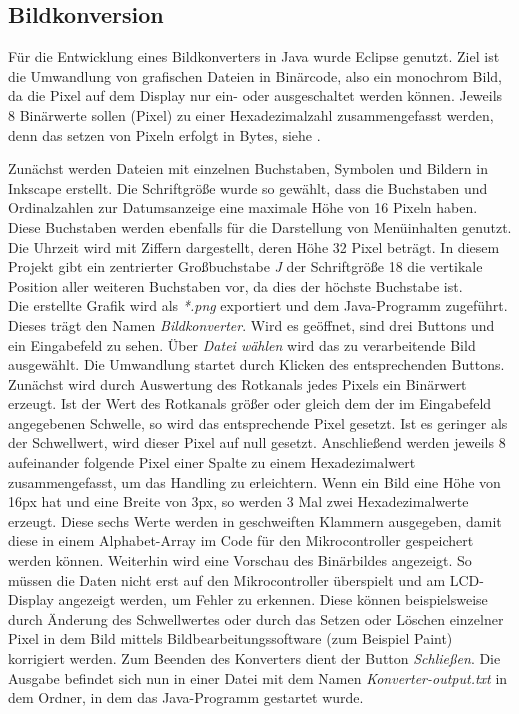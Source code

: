 \documentclass[journal, a4paper]{IEEEtran}
\begin{document}
	\subsection{Bildkonversion}
		\label{sc:Software:subsc:Bildkonverter}
		Für die Entwicklung eines Bildkonverters in Java wurde Eclipse genutzt. Ziel ist die Umwandlung von grafischen Dateien in Binärcode, also ein monochrom Bild, da die Pixel auf dem Display nur ein- oder ausgeschaltet werden können. Jeweils 8 Binärwerte sollen (Pixel) zu einer Hexadezimalzahl zusammengefasst werden, denn das setzen von Pixeln erfolgt in Bytes, siehe \cite{EADOG}.\par 
		Zunächst werden Dateien mit einzelnen Buchstaben, Symbolen und Bildern in Inkscape erstellt. Die Schriftgröße wurde so gewählt, dass die Buchstaben und Ordinalzahlen zur Datumsanzeige eine maximale Höhe von 16 Pixeln haben. Diese Buchstaben werden ebenfalls für die Darstellung von Menüinhalten genutzt. Die Uhrzeit wird mit Ziffern dargestellt, deren Höhe 32 Pixel beträgt. In diesem Projekt gibt ein zentrierter Großbuchstabe \textit{J} der Schriftgröße 18 die vertikale Position aller weiteren Buchstaben vor, da dies der höchste Buchstabe ist.\\
		Die erstellte Grafik wird als \textit{*.png} exportiert und dem Java-Programm zugeführt. Dieses trägt den Namen \textit{Bildkonverter}. Wird es geöffnet, sind drei Buttons und ein Eingabefeld zu sehen. Über \textit{Datei wählen} wird das zu verarbeitende Bild ausgewählt. Die Umwandlung startet durch Klicken des entsprechenden Buttons. Zunächst wird durch Auswertung des Rotkanals jedes Pixels ein Binärwert erzeugt. Ist der Wert des Rotkanals größer oder gleich dem der im Eingabefeld angegebenen Schwelle, so wird das entsprechende Pixel gesetzt. Ist es geringer als der Schwellwert, wird dieser Pixel auf null gesetzt. Anschließend werden jeweils 8 aufeinander folgende Pixel einer Spalte zu einem Hexadezimalwert zusammengefasst, um das Handling zu erleichtern. Wenn ein Bild eine Höhe von 16px hat und eine Breite von 3px, so werden 3 Mal zwei Hexadezimalwerte erzeugt. Diese sechs Werte werden in geschweiften Klammern ausgegeben, damit diese in einem Alphabet-Array im Code für den Mikrocontroller gespeichert werden können. Weiterhin wird eine Vorschau des Binärbildes angezeigt. So müssen die Daten nicht erst auf den Mikrocontroller überspielt und am LCD-Display angezeigt werden, um Fehler zu erkennen. Diese können beispielsweise durch Änderung des Schwellwertes oder durch das Setzen oder Löschen einzelner Pixel in dem Bild mittels Bildbearbeitungssoftware (zum Beispiel Paint) korrigiert werden. Zum Beenden des Konverters dient der Button \textit{Schließen}. Die Ausgabe befindet sich nun in einer Datei mit dem Namen \textit{Konverter-output.txt} in dem Ordner, in dem das Java-Programm gestartet wurde.\par
\end{document}
